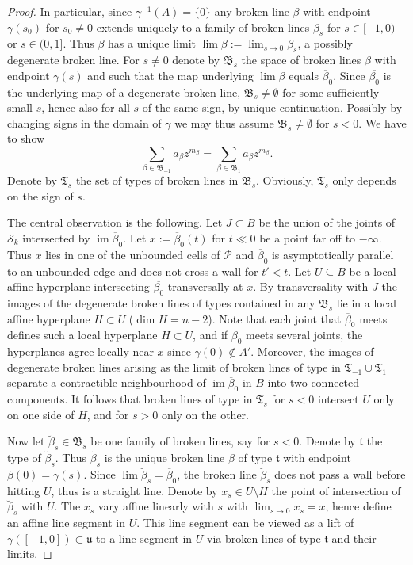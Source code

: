 \documentclass[11pt,letter]{amsart}
\theoremstyle{definition}
\theoremstyle{remark}
\numberwithin{equation}{section}
\numberwithin{figure}{section}
\newcommand {\foB}  {\mathfrak{B}}
\newcommand {\foT}  {\mathfrak{T}}
\newcommand {\fot}  {\mathfrak{t}}
\newcommand {\fou}  {\mathfrak{u}}
\newcommand {\im}  {\operatorname{im}}
\newcommand {\ol} {\overline}
\renewcommand{\P}  {\mathscr{P}}
\newcommand {\scrS}  {\mathscr{S}}
\begin{document}
\begin{proof}
In particular, since $\gamma^{-1}(A)=\{0\}$ any broken line $\beta$ with
endpoint $\gamma(s_0)$ for $s_0\neq 0$ extends uniquely to a family of broken
lines $\beta_s$ for $s\in [-1,0)$ or $s\in(0,1]$. Thus $\beta$ has a unique
limit $\lim\beta:=\lim_{s\to 0} \beta_s$, a possibly degenerate broken line. For
$s\neq 0$ denote by $\foB_s$ the space of broken lines $\beta$ with endpoint
$\gamma(s)$ and such that the map underlying $\lim\beta$ equals
$\overline\beta_0$. Since $\overline{\beta_0}$ is the underlying map of a
degenerate broken line, $\foB_s\neq \emptyset$ for some sufficiently small $s$,
hence also for all $s$ of the same sign, by unique continuation. Possibly by
changing signs in the domain of $\gamma$ we may thus assume $\foB_s\neq
\emptyset$ for $s<0$. We have to show
\begin{equation}
\label{eqn: equality of contributions}
\sum_{\beta\in\foB_{-1}} a_\beta z^{m_{\beta}}
= \sum_{\beta\in\foB_{1}} a_\beta z^{m_{\beta}}.
\end{equation}
Denote by $\foT_s$ the set of types of broken lines in $\foB_s$. Obviously,
$\foT_s$ only depends on the sign of $s$.

The central observation is the following. Let $J\subset B$ be the union of the
joints of $\scrS_k$ intersected by $\im \overline\beta_0$. Let $x:=
\overline\beta_0(t)$ for $t\ll 0$ be a point far off to $-\infty$. Thus $x$ lies
in one of the unbounded cells of $\P$ and $\overline\beta_0$ is asymptotically
parallel to an unbounded edge and does not cross a wall for $t'<t$. Let
$U\subseteq B$ be a local affine hyperplane intersecting $\overline{\beta_0}$
transversally at $x$. By transversality with $J$ the images of the degenerate
broken lines of types contained in any $\foB_s$ lie in a local affine hyperplane
$H\subset U$ ($\dim H=n-2$). Note that each joint that $\ol\beta_0$ meets
defines such a local hyperplane $H\subset U$, and if $\ol\beta_0$ meets several
joints, the hyperplanes agree locally near $x$ since $\gamma(0)\not\in A'$.
Moreover, the images of degenerate broken lines arising as the limit of broken
lines of type in $\foT_{-1}\cup\foT_1$ separate a contractible neighbourhood of
$\im\ol\beta_0$ in $B$ into two connected components. It follows that broken
lines of type in $\foT_s$ for $s<0$ intersect $U$ only on one side of $H$, and
for $s>0$ only on the other.

Now let $\breve\beta_s\in\foB_s$ be one family of broken lines, say for $s<0$.
Denote by $\fot$ the type of $\breve\beta_s$. Thus $\breve\beta_s$ is the unique
broken line $\beta$ of type $\fot$ with endpoint $\beta(0)=\gamma(s)$. Since
$\lim\breve\beta_s= \ol\beta_0$, the broken line $\breve\beta_s$ does not pass a
wall before hitting $U$, thus is a straight line. Denote by $x_s\in U\setminus
H$ the point of intersection of $\breve\beta_s$ with $U$. The $x_s$ vary affine
linearly with $s$ with $\lim_{s\to0} x_s= x$, hence define an affine line segment
in $U$. This line segment can be viewed as a lift of $\gamma([-1,0])\subset\fou$
to a line segment in $U$ via broken lines of type $\fot$ and their limits.


\end{proof}
\end{document}
